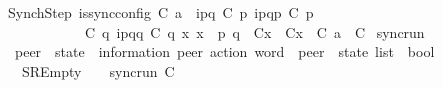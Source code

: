 \begin{isabellebody}
\ \ SynchStep{\isacharcolon}{\kern0pt}\ {\isachardoublequoteopen}{\isasymlbrakk}is{\isacharunderscore}{\kern0pt}sync{\isacharunderscore}{\kern0pt}config\ C{}{\isacharsemicolon}{\kern0pt}\ a\ {\isacharequal}{\kern0pt}\ {\isacharbang}{\kern0pt}{\isasymlangle}{\isacharparenleft}{\kern0pt}i\isactrlbsup p{\isasymrightarrow}q\isactrlesup {\isacharparenright}{\kern0pt}{\isasymrangle}{\isacharsemicolon}{\kern0pt}\ C{}\ p\ {\isasymmidarrow}{\isacharbang}{\kern0pt}{\isasymlangle}{\isacharparenleft}{\kern0pt}i\isactrlbsup p{\isasymrightarrow}q\isactrlesup {\isacharparenright}{\kern0pt}{\isasymrangle}{\isasymrightarrow}\isactrlsub {\isasymC}p\ {\isacharparenleft}{\kern0pt}C{}\ p{\isacharparenright}{\kern0pt}{\isacharsemicolon}{\kern0pt}\isanewline
\ \ \ \ \ \ \ \ \ \ \ \ \ C{}\ q\ {\isasymmidarrow}{\isacharquery}{\kern0pt}{\isasymlangle}{\isacharparenleft}{\kern0pt}i\isactrlbsup p{\isasymrightarrow}q\isactrlesup {\isacharparenright}{\kern0pt}{\isasymrangle}{\isasymrightarrow}\isactrlsub {\isasymC}q\ {\isacharparenleft}{\kern0pt}C{}\ q{\isacharparenright}{\kern0pt}{\isacharsemicolon}{\kern0pt}\ {\isasymforall}x{\isachardot}{\kern0pt}\ x\ {\isasymnotin}\ {\isacharbraceleft}{\kern0pt}p{\isacharcomma}{\kern0pt}\ q{\isacharbraceright}{\kern0pt}\ {\isasymlongrightarrow}\ C{}{\isacharparenleft}{\kern0pt}x{\isacharparenright}{\kern0pt}\ {\isacharequal}{\kern0pt}\ C{}{\isacharparenleft}{\kern0pt}x{\isacharparenright}{\kern0pt}{\isasymrbrakk}\ {\isasymLongrightarrow}\ C{}\ {\isasymmidarrow}{\isasymlangle}a{\isacharcomma}{\kern0pt}\ {\isasymzero}{\isasymrangle}{\isasymrightarrow}\ C{}{\isachardoublequoteclose}\isanewline
\isanewline
{}\isamarkupfalse%
\ sync{\isacharunderscore}{\kern0pt}run\isanewline
\ \ {\isacharcolon}{\kern0pt}{\isacharcolon}{\kern0pt}\ {\isachardoublequoteopen}{\isacharparenleft}{\kern0pt}{\isacharprime}{\kern0pt}peer\ {\isasymRightarrow}\ {\isacharprime}{\kern0pt}state{\isacharparenright}{\kern0pt}\ {\isasymRightarrow}\ {\isacharparenleft}{\kern0pt}{\isacharprime}{\kern0pt}information{\isacharcomma}{\kern0pt}\ {\isacharprime}{\kern0pt}peer{\isacharparenright}{\kern0pt}\ action\ word\ {\isasymRightarrow}\ {\isacharparenleft}{\kern0pt}{\isacharprime}{\kern0pt}peer\ {\isasymRightarrow}\ {\isacharprime}{\kern0pt}state{\isacharparenright}{\kern0pt}\ list\ {\isasymRightarrow}\ bool{\isachardoublequoteclose}\isanewline
\ \ \isanewline
\ \ \ \ SREmpty{\isacharcolon}{\kern0pt}\ \ \ \ {\isachardoublequoteopen}sync{\isacharunderscore}{\kern0pt}run\ C\ {\isasymepsilon}\ {\isacharparenleft}{\kern0pt}{\isacharbrackleft}{\kern0pt}{\isacharbrackright}{\kern0pt}{\isacharparenright}{\kern0pt}{\isachardoublequoteclose}\ {\isacharbar}{\kern0pt}\isanewline

\end{isabellebody}
